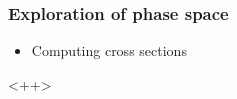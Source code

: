 \documentclass[aspectratio=169]{beamer}
\begin{document}
\begin{frame}
    \frametitle{Exploration of phase space~}
    \begin{itemize}
        \item Computing cross sections
    \end{itemize}<++>
\end{frame}

%
\end{document}
